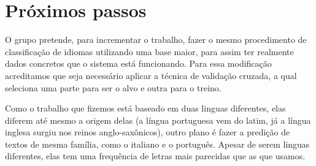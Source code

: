 \section{Próximos passos}
O grupo pretende, para incrementar o trabalho, fazer o mesmo procedimento de classificação de idiomas utilizando uma base maior, para assim ter realmente dados concretos que o sistema está funcionando. Para essa modificação acreditamos que seja necessário aplicar a técnica de validação cruzada, a qual seleciona uma parte para ser o alvo e outra para o treino.

Como o trabalho que fizemos está baseado em duas linguas diferentes, elas diferem até mesmo a origem delas (a língua portuguesa vem do latim, já a língua inglesa surgiu nos reinos anglo-saxônicos), outro plano é fazer a predição de textos de mesma família, como o italiano e o português. Apesar de serem linguas diferentes, elas tem uma frequência de letras mais parecidas que as que usamos.

